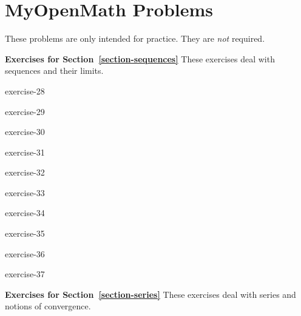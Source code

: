 \documentclass[10pt,]{book}
\numberwithin{equation}{section}
\begin{document}
\section[{MyOpenMath Problems}]{MyOpenMath Problems}\hypertarget{exercises-2}{}
\begin{introduction}{}%
\hypertarget{p-983}{}%
These problems are only intended for practice. They are \emph{not} required.%
\end{introduction}%
\par\medskip\noindent%
\textbf{Exercises for Section~\ref*{section-sequences}}\space\space\hypertarget{exercisegroup-8}{}%
\hypertarget{p-984}{}%
These exercises deal with sequences and their limits.%
\begin{exercisegroup}{1}
\begin{divisionexercise}{1}{}{}{exercise-28}%
\end{divisionexercise}%
\begin{divisionexercise}{2}{}{}{exercise-29}%
\end{divisionexercise}%
\begin{divisionexercise}{3}{}{}{exercise-30}%
\end{divisionexercise}%
\begin{divisionexercise}{4}{}{}{exercise-31}%
\end{divisionexercise}%
\begin{divisionexercise}{5}{}{}{exercise-32}%
\end{divisionexercise}%
\begin{divisionexercise}{6}{}{}{exercise-33}%
\end{divisionexercise}%
\begin{divisionexercise}{7}{}{}{exercise-34}%
\end{divisionexercise}%
\begin{divisionexercise}{8}{}{}{exercise-35}%
\end{divisionexercise}%
\begin{divisionexercise}{9}{}{}{exercise-36}%
\end{divisionexercise}%
\begin{divisionexercise}{10}{}{}{exercise-37}%
\end{divisionexercise}%
\end{exercisegroup}
\par\medskip\noindent
\par\medskip\noindent%
\textbf{Exercises for Section~\ref*{section-series}}\space\space\hypertarget{exercisegroup-9}{}%
\hypertarget{p-985}{}%
These exercises deal with series and notions of convergence.%
\end{document}
